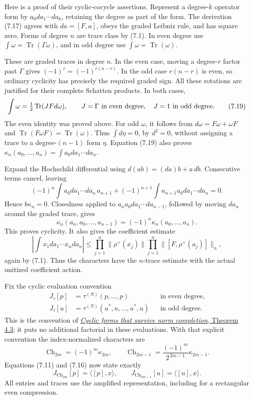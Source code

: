 \documentclass[
  11pt,
]{article}
\begin{document}
Here is a proof of their cyclic-cocycle assertions. Represent a
degree-\(k\) operator form by \(a_0da_1\cdots da_k\), retaining the
degree as part of the form. The derivation (7.17) agrees with
\(da=[F,a]\), obeys the graded Leibniz rule, and has square zero. Forms
of degree \(n\) are trace class by (7.1). In even degree use
\(\int\omega=\operatorname{Tr}(\Gamma\omega)\), and in odd degree use
\(\int\omega=\operatorname{Tr}(\omega)\).

These are graded traces in degree \(n\). In the even case, moving a
degree-\(r\) factor past \(\Gamma\) gives \((-1)^r=(-1)^{r(n-r)}\). In
the odd case \(r(n-r)\) is even, so ordinary cyclicity has precisely the
required graded sign. All these rotations are justified for their
complete Schatten products. In both cases, \[
 \int\omega=\tfrac12\operatorname{Tr}(J Fd\omega),
 \qquad
 J=\Gamma\ \hbox{in even degree},\quad J=1\ \hbox{in odd degree}.
 \tag{7.19}
\] The even identity was proved above. For odd \(\omega\), it follows
from \(d\omega=F\omega+\omega F\) and
\(\operatorname{Tr}(F\omega F)=\operatorname{Tr}(\omega)\). Thus
\(\int d\eta=0\), by \(d^2=0\), without assigning a trace to a
degree-\((n-1)\) form \(\eta\). Equation (7.19) also proves
\(\kappa_n(a_0,\ldots,a_n)=\int a_0da_1\cdots da_n\).

Expand the Hochschild differential using \(d(ab)=(da)b+a\,db\).
Consecutive terms cancel, leaving \[
 (-1)^n\int a_0da_1\cdots da_n\,a_{n+1}
   +(-1)^{n+1}\int a_{n+1}a_0da_1\cdots da_n=0 .
\] Hence \(b\kappa_n=0\). Closedness applied to
\(a_na_0da_1\cdots da_{n-1}\), followed by moving \(da_n\) around the
graded trace, gives \[
 \kappa_n(a_n,a_0,\ldots,a_{n-1})
         =(-1)^n\kappa_n(a_0,\ldots,a_n).
\] This proves cyclicity. It also gives the coefficient estimate \[
 \left|\int x_1da_1\cdots x_nda_n\right|
     \leq\prod_{j=1}^n\|\rho^+(x_j)\|
                     \prod_{j=1}^n\|[F,\rho^+(a_j)]\|_n ,
 \tag{7.20}
\] again by (7.1). Thus the characters have the \(n\)-trace estimate
with the actual unitized coefficient action.

Fix the cyclic evaluation convention \[
\begin{aligned}
 J_\tau[p]&=\tau^{(N)}(p,\ldots,p)
                    &&\text{in even degree},\\
 J_\tau[u]&=\tau^{(N)}(u^*,u,\ldots,u^*,u)
                    &&\text{in odd degree}.
\end{aligned}
 \tag{7.21}
\] This is the convention of
\href{../NCG-CYCLIC/public/reader/n-traces.html\#4-the-form-reaches-k-theory}{\emph{Cyclic
forms that survive norm completion}, Theorem 4.3}; it puts no additional
factorial in these evaluations. With that explicit convention the
index-normalized characters are \[
 \operatorname{Ch}_{2m}=(-1)^m\kappa_{2m},\qquad
 \operatorname{Ch}_{2m-1}
       =\frac{(-1)^m}{2^{\,2m-1}}\kappa_{2m-1}.
 \tag{7.22}
\] Equations (7.11) and (7.16) now state exactly \[
 J_{\operatorname{Ch}_{2m}}[p]=\langle[p],x\rangle,\qquad
 J_{\operatorname{Ch}_{2m-1}}[u]=\langle[u],x\rangle .
 \tag{7.23}
\] All entries and traces use the amplified representation, including
for a rectangular even compression.
\end{document}
